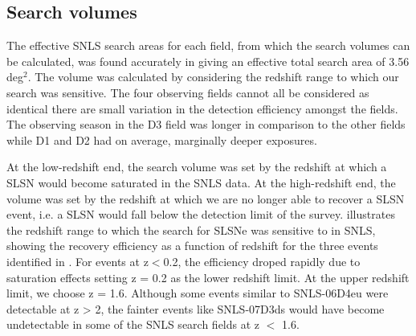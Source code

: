 \subsection{Search volumes}
\label{sec:search-volumes}
The effective SNLS search areas for each field, from which the search volumes can be calculated, was found accurately in \citet{2012AJ....144...59P} giving an effective total search area of 3.56\,deg$^2$. The volume was calculated by considering the redshift range to which our search was sensitive. The four observing fields cannot all be considered as identical there are small variation in the detection efficiency amongst the fields. The observing season in the D3 field was longer in comparison to the other fields while D1 and D2 had on average, marginally deeper exposures.

At the low-redshift end, the search volume was set by the redshift at which a SLSN would become saturated in the SNLS data. At the high-redshift end, the volume was set by the redshift at which we are no longer able to recover a SLSN event, i.e. a SLSN would fall below the detection limit of the survey.  illustrates the redshift range to which the search for SLSNe was sensitive to in SNLS, showing the recovery efficiency as a function of redshift for the three events identified in . For events at z$<$0.2, the efficiency droped rapidly due to saturation effects setting z = 0.2 as the lower redshift limit. At the upper redshift limit, we choose z = 1.6. Although some events similar to SNLS-06D4eu were detectable at z > 2, the fainter events like SNLS-07D3ds would have become undetectable in some of the SNLS search fields at z $<$ 1.6.

